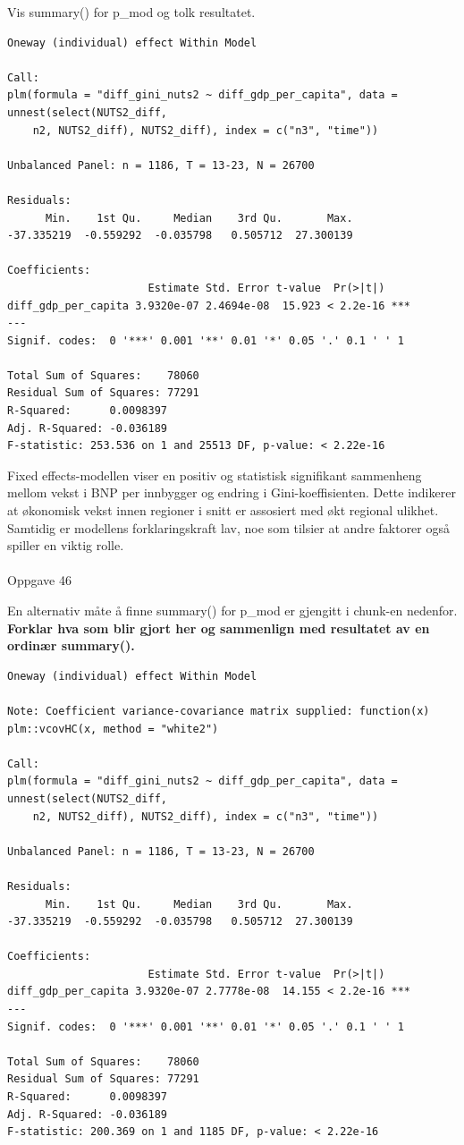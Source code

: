 \documentclass[
  a4paper,
]{article}
\makeatletter
\let\oldparagraph\paragraph
\renewcommand{\paragraph}{
    \@ifstar
      \xxxParagraphStar
      \xxxParagraphNoStar
  }
\newcommand{\xxxParagraphStar}[1]{\oldparagraph*{#1}\mbox{}}
\newcommand{\xxxParagraphNoStar}[1]{\oldparagraph{#1}\mbox{}}
\makeatother
\begin{document}
Vis summary() for p\_mod og tolk resultatet.

\begin{verbatim}
Oneway (individual) effect Within Model

Call:
plm(formula = "diff_gini_nuts2 ~ diff_gdp_per_capita", data = unnest(select(NUTS2_diff, 
    n2, NUTS2_diff), NUTS2_diff), index = c("n3", "time"))

Unbalanced Panel: n = 1186, T = 13-23, N = 26700

Residuals:
      Min.    1st Qu.     Median    3rd Qu.       Max. 
-37.335219  -0.559292  -0.035798   0.505712  27.300139 

Coefficients:
                      Estimate Std. Error t-value  Pr(>|t|)    
diff_gdp_per_capita 3.9320e-07 2.4694e-08  15.923 < 2.2e-16 ***
---
Signif. codes:  0 '***' 0.001 '**' 0.01 '*' 0.05 '.' 0.1 ' ' 1

Total Sum of Squares:    78060
Residual Sum of Squares: 77291
R-Squared:      0.0098397
Adj. R-Squared: -0.036189
F-statistic: 253.536 on 1 and 25513 DF, p-value: < 2.22e-16
\end{verbatim}

Fixed effects-modellen viser en positiv og statistisk signifikant
sammenheng mellom vekst i BNP per innbygger og endring i
Gini-koeffisienten. Dette indikerer at økonomisk vekst innen regioner i
snitt er assosiert med økt regional ulikhet. Samtidig er modellens
forklaringskraft lav, noe som tilsier at andre faktorer også spiller en
viktig rolle.

\paragraph{Oppgave 46}\label{oppgave-46}

En alternativ måte å finne summary() for p\_mod er gjengitt i chunk-en
nedenfor. \textbf{Forklar hva som blir gjort her og sammenlign med
resultatet av en ordinær summary().}

\begin{verbatim}
Oneway (individual) effect Within Model

Note: Coefficient variance-covariance matrix supplied: function(x) plm::vcovHC(x, method = "white2")

Call:
plm(formula = "diff_gini_nuts2 ~ diff_gdp_per_capita", data = unnest(select(NUTS2_diff, 
    n2, NUTS2_diff), NUTS2_diff), index = c("n3", "time"))

Unbalanced Panel: n = 1186, T = 13-23, N = 26700

Residuals:
      Min.    1st Qu.     Median    3rd Qu.       Max. 
-37.335219  -0.559292  -0.035798   0.505712  27.300139 

Coefficients:
                      Estimate Std. Error t-value  Pr(>|t|)    
diff_gdp_per_capita 3.9320e-07 2.7778e-08  14.155 < 2.2e-16 ***
---
Signif. codes:  0 '***' 0.001 '**' 0.01 '*' 0.05 '.' 0.1 ' ' 1

Total Sum of Squares:    78060
Residual Sum of Squares: 77291
R-Squared:      0.0098397
Adj. R-Squared: -0.036189
F-statistic: 200.369 on 1 and 1185 DF, p-value: < 2.22e-16
\end{verbatim}
\end{document}
